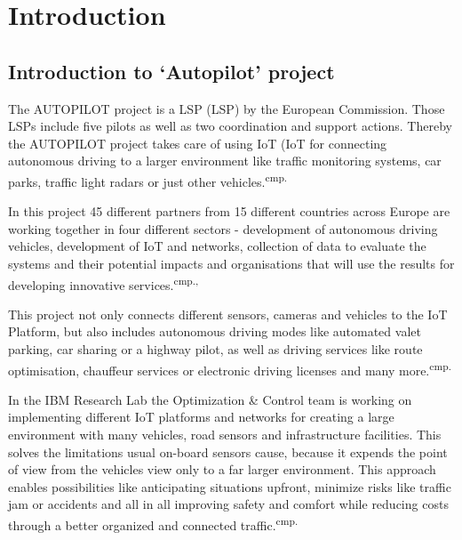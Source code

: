 
\chapter{Introduction}

\section{Introduction to `Autopilot' project}

The AUTOPILOT project is a \acs{LSP} (\acl{LSP}) by the European Commission. Those LSPs include five pilots as well as two coordination and support actions. Thereby the AUTOPILOT project takes care of using \acs{IoT} (\acl{IoT} for connecting autonomous driving to a larger environment like traffic monitoring systems, car parks, traffic light radars or just other vehicles.\textsuperscript{cmp.\cite{1}}


In this project 45 different partners from 15 different countries across Europe are working together in four different sectors - development of autonomous driving vehicles, development of IoT and networks, collection of data to evaluate the systems and their potential impacts and organisations that will use the results for developing innovative services.\textsuperscript{cmp.\cite{2},\cite{3}}


This project not only connects different sensors, cameras and vehicles to the IoT Platform, but also includes autonomous driving modes like automated valet parking, car sharing or a highway pilot, as well as driving services like route optimisation, chauffeur services or electronic driving licenses and many more.\textsuperscript{cmp.\cite{4}}


In the IBM Research Lab the Optimization \& Control team is working on implementing different IoT platforms and networks for creating a large environment with many vehicles, road sensors and infrastructure facilities. This solves the limitations usual on-board sensors cause, because it expends the point of view from the vehicles view only to a far larger environment. This approach enables possibilities like anticipating situations upfront, minimize risks like traffic jam or accidents and all in all improving safety and comfort while reducing costs through a better organized and connected traffic.\textsuperscript{cmp.\cite{5}}

